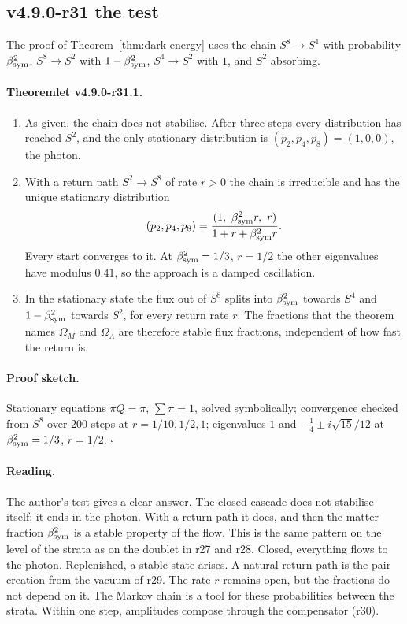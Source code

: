 \subsection*{v4.9.0-r31 the test}
\label{subsec:v490-r31-test}

The proof of Theorem~\ref{thm:dark-energy} uses the chain \(S^8\to S^4\) with probability \(\beta_{\mathrm{sym}}^2\), \(S^8\to S^2\) with \(1-\beta_{\mathrm{sym}}^2\),
\(S^4\to S^2\) with \(1\), and \(S^2\) absorbing.

\paragraph{Theoremlet v4.9.0-r31.1.}
\begin{enumerate}[leftmargin=2em]
\item[(a)] As given, the chain does not stabilise.  After three steps every distribution has reached \(S^2\), and the only stationary
distribution is \((p_2,p_4,p_8)=(1,0,0)\), the photon.
\item[(b)] With a return path \(S^2\to S^8\) of rate \(r>0\) the chain is irreducible and has the unique stationary distribution
\[
(p_2,p_4,p_8)=\frac{(1,\ \bsym^2r,\ r)}{1+r+\bsym^2r}.
\]
Every start converges to it.  At \(\beta_{\mathrm{sym}}^2=1/3\), \(r=1/2\) the other eigenvalues have modulus \(0.41\), so the approach is a damped
oscillation.
\item[(c)] In the stationary state the flux out of \(S^8\) splits into \(\beta_{\mathrm{sym}}^2\) towards \(S^4\) and \(1-\beta_{\mathrm{sym}}^2\) towards \(S^2\), for every return
rate \(r\).  The fractions that the theorem names \(\Omega_M\) and \(\Omega_\Lambda\) are therefore stable flux fractions, independent of how
fast the return is.
\end{enumerate}

\paragraph{Proof sketch.}
Stationary equations \(\pi Q=\pi\), \(\sum\pi=1\), solved symbolically; convergence checked from \(S^8\) over \(200\) steps at
\(r=1/10,1/2,1\); eigenvalues \(1\) and \(-\tfrac14\pm i\sqrt{15}/12\) at \(\beta_{\mathrm{sym}}^2=1/3\), \(r=1/2\).  \(\square\)

\paragraph{Reading.}
The author's test gives a clear answer.  The closed cascade does not stabilise itself; it ends in the photon.  With a return path it
does, and then the matter fraction \(\beta_{\mathrm{sym}}^2\) is a stable property of the flow.  This is the same pattern on the level of the strata as on
the doublet in r27 and r28.  Closed, everything flows to the photon.  Replenished, a stable state arises.  A natural return path is the
pair creation from the vacuum of r29.  The rate \(r\) remains open, but the fractions do not depend on it.  The Markov chain is a
tool for these probabilities between the strata.  Within one step, amplitudes compose through the compensator (r30).

